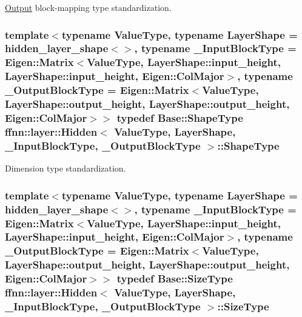 \hyperlink{classffnn_1_1layer_1_1_output}{Output} block-\/mapping type standardization. 

\hypertarget{classffnn_1_1layer_1_1_hidden_abdfcf81b3846fae3b19a207424695df0}{
\subsubsection[{Shape\-Type}]{\setlength{\rightskip}{0pt plus 5cm}template$<$typename Value\-Type, typename Layer\-Shape = hidden\-\_\-layer\-\_\-shape$<$$>$, typename \-\_\-\-Input\-Block\-Type = Eigen\-::\-Matrix$<$\-Value\-Type, Layer\-Shape\-::input\-\_\-height, Layer\-Shape\-::input\-\_\-height, Eigen\-::\-Col\-Major$>$, typename \-\_\-\-Output\-Block\-Type = Eigen\-::\-Matrix$<$\-Value\-Type, Layer\-Shape\-::output\-\_\-height, Layer\-Shape\-::output\-\_\-height, Eigen\-::\-Col\-Major$>$$>$ typedef {\bf Base\-::\-Shape\-Type} {\bf ffnn\-::layer\-::\-Hidden}$<$ Value\-Type, Layer\-Shape, \-\_\-\-Input\-Block\-Type, \-\_\-\-Output\-Block\-Type $>$\-::{\bf Shape\-Type}}}\label{classffnn_1_1layer_1_1_hidden_abdfcf81b3846fae3b19a207424695df0}


Dimension type standardization. 

\hypertarget{classffnn_1_1layer_1_1_hidden_ac148012cb544a39841675601090cd4c8}{
\subsubsection[{Size\-Type}]{\setlength{\rightskip}{0pt plus 5cm}template$<$typename Value\-Type, typename Layer\-Shape = hidden\-\_\-layer\-\_\-shape$<$$>$, typename \-\_\-\-Input\-Block\-Type = Eigen\-::\-Matrix$<$\-Value\-Type, Layer\-Shape\-::input\-\_\-height, Layer\-Shape\-::input\-\_\-height, Eigen\-::\-Col\-Major$>$, typename \-\_\-\-Output\-Block\-Type = Eigen\-::\-Matrix$<$\-Value\-Type, Layer\-Shape\-::output\-\_\-height, Layer\-Shape\-::output\-\_\-height, Eigen\-::\-Col\-Major$>$$>$ typedef {\bf Base\-::\-Size\-Type} {\bf ffnn\-::layer\-::\-Hidden}$<$ Value\-Type, Layer\-Shape, \-\_\-\-Input\-Block\-Type, \-\_\-\-Output\-Block\-Type $>$\-::{\bf Size\-Type}}}\label{classffnn_1_1layer_1_1_hidden_ac148012cb544a39841675601090cd4c8}


